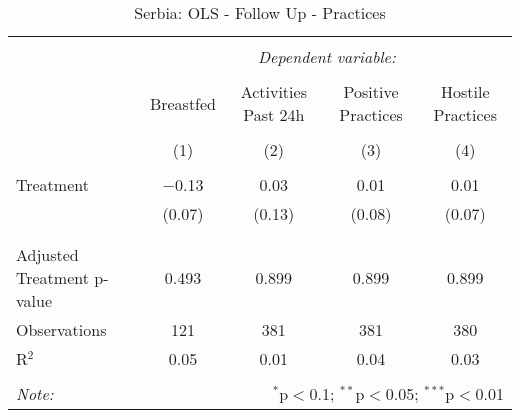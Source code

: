 
\begin{table}[!htbp] \centering 
  \caption{Serbia: OLS - Follow Up - Practices} 
  \label{tbl:Serbia: OLS - Follow Up - Practices} 
\begin{tabular}{@{\extracolsep{5pt}}lcccc} 
\\[-1.8ex]\hline 
\hline \\[-1.8ex] 
 & \multicolumn{4}{c}{\textit{Dependent variable:}} \\ 
\cline{2-5} 
\\[-1.8ex] & Breastfed & Activities Past 24h & Positive Practices & Hostile Practices \\ 
\\[-1.8ex] & (1) & (2) & (3) & (4)\\ 
\hline \\[-1.8ex] 
 Treatment & $-$0.13 & 0.03 & 0.01 & 0.01 \\ 
  & (0.07) & (0.13) & (0.08) & (0.07) \\ 
  & & & & \\ 
\hline \\[-1.8ex] 
Adjusted Treatment p-value & 0.493 & 0.899 & 0.899 & 0.899 \\ 
Observations & 121 & 381 & 381 & 380 \\ 
R$^{2}$ & 0.05 & 0.01 & 0.04 & 0.03 \\ 
\hline 
\hline \\[-1.8ex] 
\textit{Note:}  & \multicolumn{4}{r}{$^{*}$p$<$0.1; $^{**}$p$<$0.05; $^{***}$p$<$0.01} \\ 
\end{tabular} 
\end{table} 
